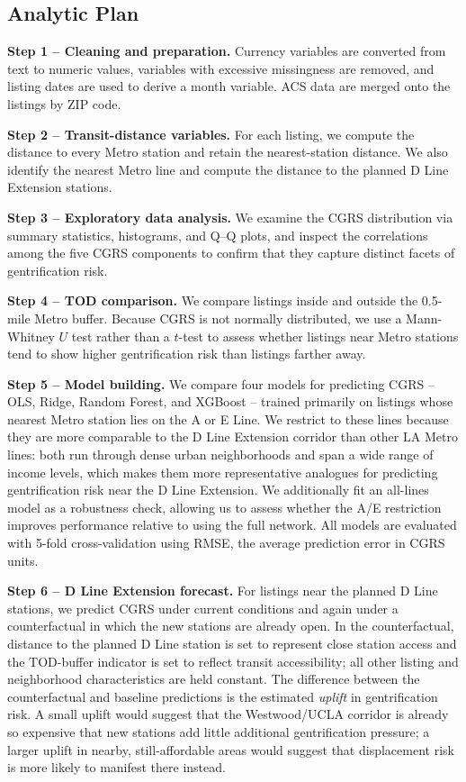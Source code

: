 \documentclass[11pt]{article}
\begin{document}
\subsection{Analytic Plan}

\textbf{Step 1 -- Cleaning and preparation.} Currency variables are converted from text to numeric values, variables with excessive missingness are removed, and listing dates are used to derive a month variable. ACS data are merged onto the listings by ZIP code.

\textbf{Step 2 -- Transit-distance variables.} For each listing, we compute the distance to every Metro station and retain the nearest-station distance. We also identify the nearest Metro line and compute the distance to the planned D Line Extension stations.

\textbf{Step 3 -- Exploratory data analysis.} We examine the CGRS distribution via summary statistics, histograms, and Q--Q plots, and inspect the correlations among the five CGRS components to confirm that they capture distinct facets of gentrification risk.

\textbf{Step 4 -- TOD comparison.} We compare listings inside and outside the 0.5-mile Metro buffer. Because CGRS is not normally distributed, we use a Mann-Whitney $U$ test rather than a $t$-test to assess whether listings near Metro stations tend to show higher gentrification risk than listings farther away.

\textbf{Step 5 -- Model building.} We compare four models for predicting CGRS -- OLS, Ridge, Random Forest, and XGBoost -- trained primarily on listings whose nearest Metro station lies on the A or E Line. We restrict to these lines because they are more comparable to the D Line Extension corridor than other LA Metro lines: both run through dense urban neighborhoods and span a wide range of income levels, which makes them more representative analogues for predicting gentrification risk near the D Line Extension. We additionally fit an all-lines model as a robustness check, allowing us to assess whether the A/E restriction improves performance relative to using the full network. All models are evaluated with 5-fold cross-validation using RMSE, the average prediction error in CGRS units.

\textbf{Step 6 -- D Line Extension forecast.} For listings near the planned D Line stations, we predict CGRS under current conditions and again under a counterfactual in which the new stations are already open. In the counterfactual, distance to the planned D Line station is set to represent close station access and the TOD-buffer indicator is set to reflect transit accessibility; all other listing and neighborhood characteristics are held constant. The difference between the counterfactual and baseline predictions is the estimated \emph{uplift} in gentrification risk. A small uplift would suggest that the Westwood/UCLA corridor is already so expensive that new stations add little additional gentrification pressure; a larger uplift in nearby, still-affordable areas would suggest that displacement risk is more likely to manifest there instead.
\end{document}

